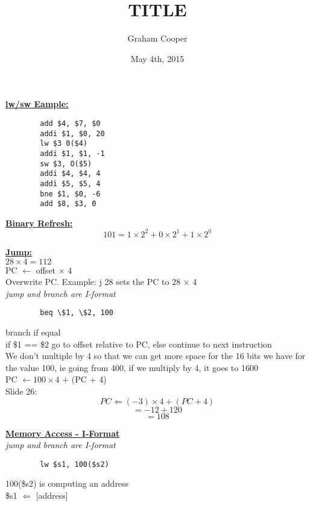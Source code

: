 \documentclass[12pt]{article}
\title{\vspace{-15ex}TITLE\vspace{-1ex}}
\date{May 4th, 2015}
\author{Graham Cooper}
\newcommand{\myt}[1]{\textbf{\underline{#1}}}
\begin{document}
	\maketitle
	
	\myt{lw/sw Eample:}\\
	\lstset{language=[mips]Assembler}
	\begin{lstlisting}
		add $4, $7, $0
		addi $1, $0, 20
		lw $3 0($4)
		addi $1, $1, -1
		sw $3, O($5)
		addi $4, $4, 4
		addi $5, $5, 4
		bne $1, $0, -6
		add $8, $3, 0
	\end{lstlisting}
	\myt{Binary Refresh:}\\
	$$101 = 1 \times 2^2 + 0 \times 2^1 + 1 \times 2^0$$
	
	\myt{Jump:}\\
	$28 \times 4 = 112$\\
	PC $\leftarrow$ offset $\times$ 4\\
	Overwrite PC.
	Example: j 28 sets the PC to 28 $\times$ 4\\
	
	\emph{jump and branch are I-format}
	\lstset{language=[mips]Assembler}
	\begin{lstlisting}
		beq \$1, \$2, 100
	\end{lstlisting}
	branch if equal\\
	if \$1 == \$2 go to offset relative to PC, else continue to next instruction\\
	
	We don't multiple by 4 so that we can get more space for the 16 bits we have for the value 100, ie going from 400, if we multiply by 4, it goes to 1600\\
	
	PC $\leftarrow 100 \times 4$ + (PC + 4)\\
	
	Slide 26:
	$$PC \Leftarrow (-3) \times 4 + (PC + 4)$$
	$$ = -12 + 120$$
	$$ = 108$$
	
	\myt{Memory Access - I-Format}\\
	\emph{jump and branch are I-format}
	\lstset{language=[mips]Assembler}
	\begin{lstlisting}
		lw $s1, 100($s2)
	\end{lstlisting}
	100(\$s2) is computing an address\\
	\$s1 $\Leftarrow$ [address]\\
	
	
	
\end{document}
